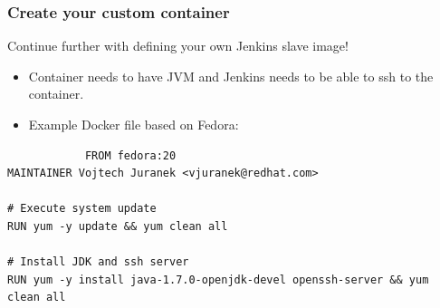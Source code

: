 \documentclass[10pt,utf8]{beamer}
\begin{document}
\begin{frame}[fragile]
  \frametitle{Create your custom container}
	Continue further with defining your own Jenkins slave image! \\
	\begin{itemize}
		\item Container needs to have JVM and Jenkins needs to be able to ssh to the container.
		\item Example Docker file based on Fedora:
	\end{itemize}

	\scriptsize{
		\begin{verbatim}
			FROM fedora:20                                                                                                                                                                                                   
MAINTAINER Vojtech Juranek <vjuranek@redhat.com>                                                                                                                                                                 
                                                                                                                                                                                                                 
# Execute system update                                                                                                                                                                                          
RUN yum -y update && yum clean all                                                                                                                                                                               
                                                                                                                                                                                                                 
# Install JDK and ssh server                                                                                                                                                                                     
RUN yum -y install java-1.7.0-openjdk-devel openssh-server && yum clean all                                                                                                                                      
                                                                                                                                                                                                                 

\end{verbatim}}
\end{frame}
\end{document}
